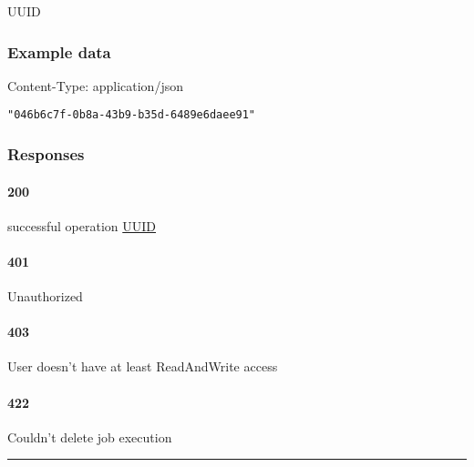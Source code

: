 UUID

\hypertarget{example-data-8}{%
\subsubsection*{Example data}\label{example-data-8}}

Content-Type: application/json

\begin{verbatim}
"046b6c7f-0b8a-43b9-b35d-6489e6daee91"
\end{verbatim}

\hypertarget{responses-8}{%
\subsubsection*{Responses}\label{responses-8}}

\hypertarget{section-28}{%
\paragraph{200}\label{section-28}}

successful operation \protect\hyperlink{UUID}{UUID}

\hypertarget{section-29}{%
\paragraph{401}\label{section-29}}

Unauthorized \protect\hyperlink{}{}

\hypertarget{section-30}{%
\paragraph{403}\label{section-30}}

User doesn't have at least ReadAndWrite access \protect\hyperlink{}{}

\hypertarget{section-31}{%
\paragraph{422}\label{section-31}}

Couldn't delete job execution \protect\hyperlink{}{}

\begin{center}\rule{0.5\linewidth}{0.5pt}\end{center}

\protect\hypertarget{getJobsExecutions}{}{}



